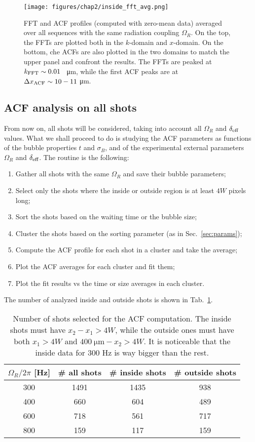 \begin{figure}[t!]
    \centering
    \texttt{[image: figures/chap2/inside\_fft\_avg.png]}
    \caption{FFT and ACF profiles (computed with zero-mean data) averaged over all sequences with the same radiation coupling $\Omega_R$. On the top, the FFTs are plotted both in the $k$-domain and $x$-domain. On the bottom, che ACFs are also plotted in the two domains to match the upper panel and confront the results.
    The FFTs are peaked at $k_{\rm FFT} \sim 0.01$ \unit{\per\micro\meter}, while the first ACF peaks are at $\Delta x_{\rm ACF} \sim 10-11$ \unit{\micro\meter}.}
    \label{fig:inside_avg}
\end{figure}

\subsection{ACF analysis on all shots}
From now on, all shots will be considered, taking into account all $\Omega_R$ and $\delta_{\rm eff}$ values. What we shall proceed to do is studying the ACF parameters as functions of the bubble properties $t$ and $\sigma_B$, and of the experimental external parameters $\Omega_R$ and $\delta_{\rm eff}$.
The routine is the following:
\begin{enumerate}
    \item Gather all shots with the same $\Omega_R$ and save their bubble parameters;
    \item Select only the shots where the inside or outside region is at least $4W$ pixels long;
    \item Sort the shots based on the waiting time or the bubble size;
    \item Cluster the shots based on the sorting parameter (as in Sec.\ \ref{sec:params});
    \item Compute the ACF profile for each shot in a cluster and take the average;
    \item Plot the ACF averages for each cluster and fit them;
    \item Plot the fit results vs the time or size averages in each cluster.
\end{enumerate}
The number of analyzed inside and outside shots is shown in Tab.\ \ref{tab:shots}.
\begin{table}[ht!]
    \centering
    \begin{tabular}{c|c|c|c}
        $\Omega_R/2\pi$ [\unit{\hertz}] & \# all shots & \# inside shots & \# outside shots \\
        \hline
        300 & 1491 & 1435 & 938\\   
        400 & 660 & 604 & 489\\
        600 & 718 & 561 & 717\\
        800 & 159 & 117 & 159\\     
    \end{tabular}
    \caption{Number of shots selected for the ACF computation. The inside shots must have $x_2-x_1 > 4W$, while the outside ones must have both $x_1 > 4W$ and $400\ \unit{\micro\meter} - x_2 > 4W$. It is noticeable that the inside data for 300 \unit{\hertz} is way bigger than the rest.}
    \label{tab:shots}
\end{table}

